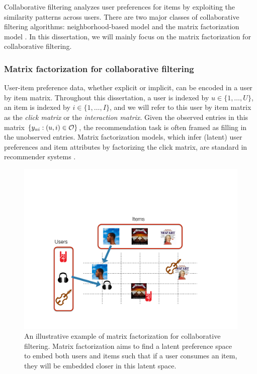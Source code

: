 Collaborative filtering analyzes user preferences for items by exploiting the similarity patterns across users. There are two major classes of collaborative filtering algorithms: neighborhood-based model \citep{sarwar2001item} and the matrix factorization model \citep{koren2009matrix}. In this dissertation, we will mainly focus on the matrix factorization for collaborative filtering. 

\subsubsection{Matrix factorization for collaborative filtering} 
\label{chpt:background:sec:mf_cf}

User-item preference data, whether explicit or implicit, can be encoded in a user by item matrix. Throughout this dissertation, a user is indexed by $u \in \{1, \dots, U\}$, an item is indexed by $i \in \{1, \dots, I\}$, and we will refer to this user by item matrix as the \emph{click matrix} or the \emph{interaction matrix}. Given the observed entries in this matrix $\{y_{ui}: (u, i) \in \mathcal{O}\}$, the recommendation task is often framed as filling in the unobserved entries.  Matrix factorization models, which infer (latent) user preferences and item attributes by factorizing the click matrix, are standard in recommender systems \citep{koren2009matrix}. 

\begin{figure}
  \centering
    \includegraphics[width=\textwidth]{fig/cf_cartoon}
      \caption{An illustrative example of matrix factorization for collaborative filtering. Matrix factorization aims to find a latent preference space to embed both users and items such that if a user consumes an item, they will be embedded closer in this latent space.}
      \label{chpt:background:fig:cf_cartoon}
\end{figure}

